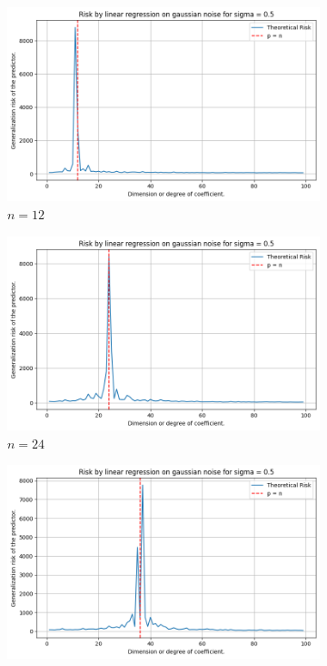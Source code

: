 \documentclass[10pt,oneside,oldfontcommands,dvipsnames,article]{memoir}
\begin{document}
\begin{figure}[htb]
  \centering
  \newcommand{\imgwidth}{0.24\textwidth}

  \begin{subfigure}[b]{\imgwidth}
    \includegraphics[width=\linewidth]{img/descent_devel1.png}
    \caption{$n=12$}\label{fig:1a2}
  \end{subfigure}%
  \hfill
  \begin{subfigure}[b]{\imgwidth}
    \includegraphics[width=\linewidth]{img/descent_devel2.png}
    \caption{$n=24$}\label{fig:1b2}
  \end{subfigure}%
  \hfill
  \begin{subfigure}[b]{\imgwidth}
    \includegraphics[width=\linewidth]{img/descent_devel3.png}

\end{subfigure}
\end{figure}
\end{document}
